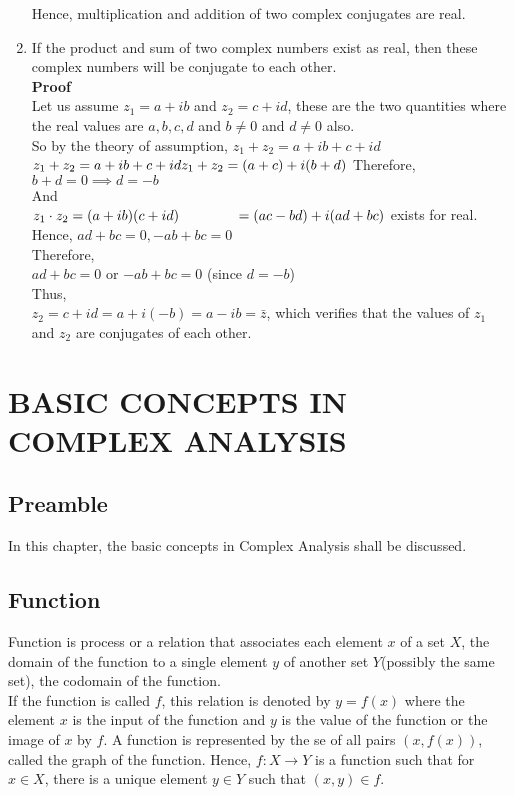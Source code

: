 \documentclass[12pt]{report}
\newcommand{\sps}{\\[0.2cm]}
\newcommand{\bt}[1]{\textbf{#1}}
\newcommand{\NI}{\noindent}
\begin{document}
\begin{enumerate}
		Hence, multiplication and addition of two complex conjugates are real.\\
		\item If the product and sum of two complex numbers exist as real, then these complex numbers will be conjugate to each other.\sps
		\bt{Proof}\sps
		Let us assume $z_1 = a+ib$ and $z_2 = c+id$, these are the two quantities where the real values are $a,b,c,d$ and $b\neq 0$ and $d\neq 0$ also.\sps
		So by the theory of assumption, $z_1 + z_2 = a+ib + c+id$\\
		$
			z_1+z_2 = a+ib + c +id\sps
			z_1+z_2 = (a+c) + i(b+d)\sps
		$
		Therefore, $b+d=0 \implies d = -b$\sps
		And\sps
		$
			z_1 \cdot z_2 = (a+ib)(c+id)\\
			~~~~~~~~~~~~ = (ac - bd) + i(ad+bc)$ exists for real.\\
		Hence, $ad+bc=0, -ab+bc=0$\\
		Therefore,\\
		$ad+bc=0$ or $-ab + bc =0$ (since $d=-b$)\\
		Thus,\\
		$z_2 = c+id=a+i(-b)=a-ib=\bar{z}$, which verifies that the values of $z_1$ and $z_2$ are conjugates of each other.
	\end{enumerate}

	\newpage
	
	\chapter{BASIC CONCEPTS IN COMPLEX ANALYSIS}
	\section{Preamble}
	In this chapter, the basic concepts in Complex Analysis shall be discussed.
	
	\section{Function}
	Function is process or a relation that associates each element $x$ of a set $X$, the domain of the function to a single element $y$ of another set $Y$(possibly the same set), the codomain of the function.\\
	
	\NI If the function is called $f$, this relation is denoted by $y=f(x)$ where the element $x$ is the input of the function and $y$ is the value of the function or the image of $x$ by $f$. A function is represented by the se of all pairs $(x,f(x))$, called the graph of the function. Hence, $f:X\rightarrow Y$ is a function such that for $x\in X$, there is a unique element $y\in Y$ such that $(x,y)\in f$.
\end{document}
